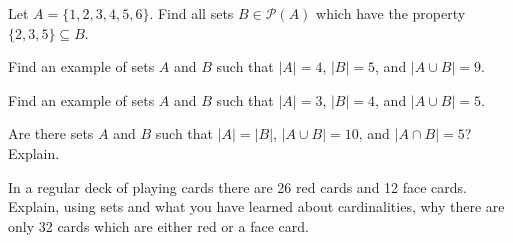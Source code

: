 \documentclass[10pt,]{book}
\theoremstyle{plain}
\theoremstyle{definition}
\theoremstyle{definition}
\theoremstyle{definition}
\theoremstyle{definition}
\numberwithin{equation}{chapter}
\def\pow{\mathcal P}
\begin{document}
\begin{divisionexercise}{12}\hypertarget{exercise-198}{}
\hypertarget{p-1687}{}%
Let \(A = \{1,2,3,4,5,6\}\). Find all sets \(B \in \pow(A)\) which have the property \(\{2,3,5\} \subseteq B\).%
\end{divisionexercise}%
\begin{divisionexercise}{13}\hypertarget{exercise-199}{}
\hypertarget{p-1688}{}%
Find an example of sets \(A\) and \(B\) such that \(|A| = 4\), \(|B| = 5\), and \(|A \cup B| = 9\).%
\end{divisionexercise}%
\begin{divisionexercise}{14}\hypertarget{exercise-200}{}
\hypertarget{p-1690}{}%
Find an example of sets \(A\) and \(B\) such that \(|A| = 3\), \(|B| = 4\), and \(|A \cup B| = 5\).%
\end{divisionexercise}%
\begin{divisionexercise}{15}\hypertarget{exercise-201}{}
\hypertarget{p-1691}{}%
Are there sets \(A\) and \(B\) such that \(|A| = |B|\), \(|A\cup B| = 10\), and \(|A\cap B| = 5\)? Explain.%
\end{divisionexercise}%
\begin{divisionexercise}{16}\hypertarget{exercise-202}{}
\hypertarget{p-1692}{}%
In a regular deck of playing cards there are 26 red cards and 12 face cards. Explain, using sets and what you have learned about cardinalities, why there are only 32 cards which are either red or a face card.%
\end{divisionexercise}%
\typeout{************************************************}
\typeout{************************************************}
\end{document}
